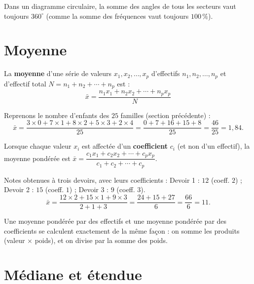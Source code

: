 \begin{remarque}
Dans un diagramme circulaire, la somme des angles de tous les secteurs vaut toujours
$360^{\circ}$ (comme la somme des fréquences vaut toujours $100\,\%$).
\end{remarque}

\section{Moyenne}

\begin{definition}
La \textbf{moyenne} d'une série de valeurs $x_1,x_2,\ldots,x_p$ d'effectifs
$n_1,n_2,\ldots,n_p$ et d'effectif total $N=n_1+n_2+\cdots+n_p$ est :
\[
\bar{x}=\frac{n_1x_1+n_2x_2+\cdots+n_px_p}{N}
\]
\end{definition}

\begin{exemple}
Reprenons le nombre d'enfants des $25$ familles (section précédente) :
\[
\bar{x}=\frac{3\times0+7\times1+8\times2+5\times3+2\times4}{25}=\frac{0+7+16+15+8}{25}=\frac{46}{25}=1{,}84.
\]
\end{exemple}

\begin{propriete}
Lorsque chaque valeur $x_i$ est affectée d'un \textbf{coefficient} $c_i$ (et non d'un
effectif), la moyenne pondérée est $\bar{x}=\dfrac{c_1x_1+c_2x_2+\cdots+c_px_p}{c_1+c_2+\cdots+c_p}$.
\end{propriete}

\begin{exemple}
Notes obtenues à trois devoirs, avec leurs coefficients : Devoir 1 : $12$ (coeff. $2$) ;
Devoir 2 : $15$ (coeff. $1$) ; Devoir 3 : $9$ (coeff. $3$).
\[
\bar{x}=\frac{12\times2+15\times1+9\times3}{2+1+3}=\frac{24+15+27}{6}=\frac{66}{6}=11.
\]
\end{exemple}

\begin{remarque}
Une moyenne pondérée par des effectifs et une moyenne pondérée par des coefficients se
calculent exactement de la même façon : on somme les produits (valeur $\times$ poids), et on
divise par la somme des poids.
\end{remarque}

\section{Médiane et étendue}

